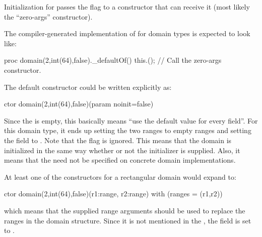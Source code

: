 Initialization for  passes the  flag to a constructor that can
receive it (most likely the ``zero-args'' constructor).

The compiler-generated implementation of  for domain types is expected
to look like:
\begin{chapel}
  proc domain(2,int(64),false)._defaultOf() {
    this.(); // Call the zero-args constructor.
  }
\end{chapel}
The default constructor could be written explicitly as:
\begin{chapel}
  ctor domain(2,int(64),false)(param noinit=false) {
  }
\end{chapel}
\noindent
Since the  is empty, this basically means ``use the default value
for every field''.  For this domain type, it ends up setting the two ranges to empty
ranges and setting the  field to .  Note that the  flag
is ignored.  This means that the domain is initialized in the same way whether or not the
 initializer is supplied.  Also, it means that the 
need not be specified on concrete domain implementations.

At least one of the constructors for a rectangular domain would expand to:
\begin{chapel}
  ctor domain(2,int(64),false)(r1:range, r2:range) {
    with (ranges = (r1,r2))
  }
\end{chapel}
\noindent
which means that the supplied range arguments should be used to replace the ranges in the
domain structure.  Since it is not mentioned in the , the
 field is set to .

